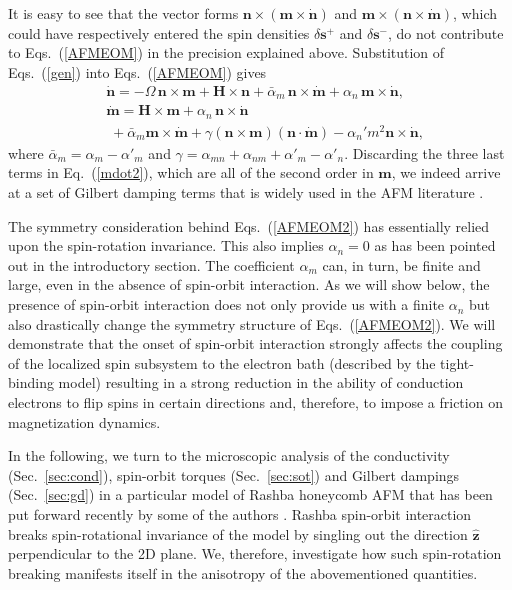 \documentclass[%
  twocolumn,
  aps,
  prb,
  amsmath,
  amssymb,
  superscriptaddress,
  nofootinbib,
  floatfix
]{revtex4-1}
\newcommand{\beml}{\begin{subequations}}
\newcommand{\eml}{\end{subequations}}
\newcommand{\n}{\nonumber}
\newcommand{\bb}{\boldsymbol}
\newcommand{\0}{^{\phantom{\dagger}}}
\begin{document}
It is easy to see that the vector forms $\bb{n}\times(\bb{m}\times\dot{\bb{n}})$ and $\bb{m}\times(\bb{n}\times \dot{\bb{m}})$, which could have respectively entered the spin densities $\delta\bb{s}^+$ and $\delta\bb{s}^-$, do not contribute to Eqs.~(\ref{AFMEOM}) in the precision explained above.  
Substitution of Eqs.~(\ref{gen}) into Eqs.~(\ref{AFMEOM}) gives 
\beml
\label{AFMEOM2}
\begin{align}
\label{ndot2}
&\dot{\bb{n}} = -\Omega\, \bb{n}\!\times\!\bb{m} +\bb{H}\!\times\!\bb{n}+\bar{\alpha}_m\,\bb{n}\!\times\!\dot{\bb{m}}+\alpha_n\,\bb{m}\!\times\! \dot{\bb{n}},\\
\label{mdot2}
&\dot{\bb{m}} =\bb{H}\times\bb{m}+\alpha_n\,\bb{n} \times \dot{\bb{n}}\n\\
&\;+\bar{\alpha}_m \bb{m} \times \dot{\bb{m}} +\gamma (\bb{n}\times\bb{m})(\bb{n}\cdot\dot{\bb{m}}) - \alpha_n'm^2\bb{n}\times\dot{\bb{n}} ,
\end{align}
\eml
where $\bar{\alpha}_m=\alpha_m\!-\!\alpha'_m$ and $\gamma=\alpha_{mn}\!+\!\alpha_{nm}\!+\!\alpha'_m\!-\!\alpha'_n$. Discarding the three last terms in Eq.~(\ref{mdot2}), which are all of the second order in $\bb{m}$, we indeed arrive at a set of Gilbert damping terms that is  widely used in the AFM literature \cite{Kamra2018,PhysRevMaterials.1.061401,Yuan_2019}. 

The symmetry consideration behind Eqs.~(\ref{AFMEOM2}) has essentially relied upon the spin-rotation invariance. This also implies $\alpha_n=0$ as has been pointed out in the introductory section. The coefficient $\alpha_m$ can, in turn, be finite and large, even in the absence of spin-orbit interaction. As we will show below, the presence of spin-orbit interaction does not only provide us with a finite $\alpha_n$ but also drastically change the symmetry structure of Eqs.~(\ref{AFMEOM2}). We will demonstrate that the onset of spin-orbit interaction strongly affects the coupling of the localized spin subsystem to the electron bath (described by the tight-binding model) resulting in a strong reduction in the ability of conduction electrons to flip spins in certain directions and, therefore, to impose a friction on magnetization dynamics. 

In the following, we turn to the microscopic analysis of the conductivity (Sec.~\ref{sec:cond}), spin-orbit torques (Sec.~\ref{sec:sot}) and Gilbert dampings (Sec.~\ref{sec:gd}) in a particular model of Rashba honeycomb AFM that has been put forward recently by some of the authors \cite{Sumit2019}. Rashba spin-orbit interaction breaks spin-rotational invariance of the model by singling out the direction $\hat{\bb{z}}$ perpendicular to the 2D plane. We, therefore, investigate how such spin-rotation breaking manifests itself in the anisotropy of the abovementioned quantities.  
\end{document}
